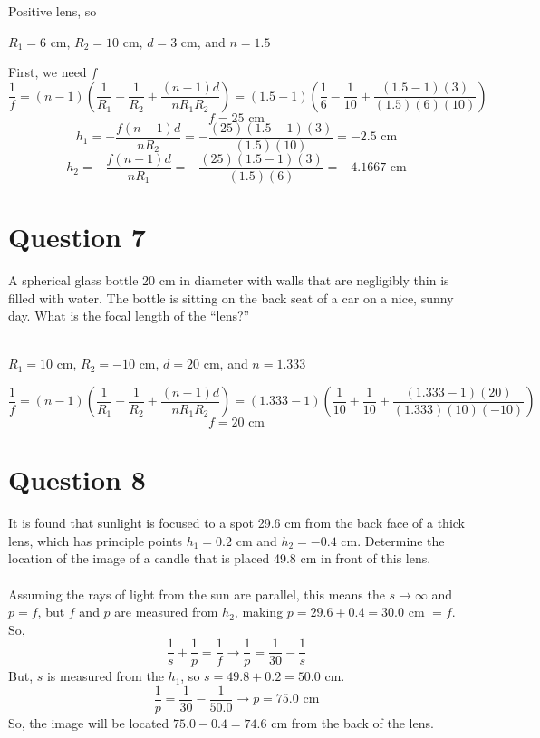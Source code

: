 \documentclass[a4paper]{article}
\begin{document}
Positive lens, so
\begin{center}
    $R_1 = 6$ cm, $R_2 = 10$ cm, $d = 3$ cm, and $n = 1.5$
\end{center}
First, we need $f$
$$ \frac{1}{f} = (n - 1) \left(\frac{1}{R_1} - \frac{1}{R_2} + \frac{(n-1)d}{nR_1 R_2}\right) = (1.5 - 1) \left(\frac{1}{6} - \frac{1}{10} + \frac{(1.5-1)(3)}{(1.5)(6)(10)}\right)$$
$$ f = 25 \textrm{ cm} $$
$$ h_1 = - \frac{f(n-1)d}{nR_2} = - \frac{(25)(1.5-1)(3)}{(1.5)(10)} = -2.5 \textrm{ cm}$$
$$ h_2 = - \frac{f(n-1)d}{nR_1} = - \frac{(25)(1.5-1)(3)}{(1.5)(6)} = -4.1667 \textrm{ cm}$$

\section*{Question 7}
A spherical glass bottle 20 cm in diameter with walls that are negligibly thin is filled with water.
The bottle is sitting on the back seat of a car on a nice, sunny day. What is the focal length of the
“lens?”\\\\

\begin{center}
    $R_1=10$ cm, $R_2=-10$ cm, $d = 20$ cm, and $n = 1.333$
\end{center}
$$ \frac{1}{f} = (n - 1) \left(\frac{1}{R_1} - \frac{1}{R_2} + \frac{(n-1)d}{nR_1 R_2}\right) = (1.333 - 1) \left(\frac{1}{10} + \frac{1}{10} + \frac{(1.333-1)(20)}{(1.333)(10)(-10)}\right)$$
$$ f = 20 \textrm{ cm}$$


\section*{Question 8}
It is found that sunlight is focused to a spot 29.6 cm from the back face of a thick lens, which has
principle points $h_1 = 0.2$ cm and $h_2 = -0.4$ cm. Determine the location of the image of a candle that
is placed 49.8 cm in front of this lens.\\\\

Assuming the rays of light from the sun are parallel, this means the $s \rightarrow \infty$ and $p=f$, but $f$ and $p$ are measured from $h_2$, making
$p = 29.6 + 0.4 = 30.0$ cm $=f$. So,
$$ \frac{1}{s} + \frac{1}{p} = \frac{1}{f} \rightarrow \frac{1}{p} = \frac{1}{30} - \frac{1}{s}$$
But, $s$ is measured from the $h_1$, so $s = 49.8 + 0.2 = 50.0$ cm.
$$ \frac{1}{p} = \frac{1}{30} - \frac{1}{50.0} \rightarrow p=75.0 \textrm{ cm}$$
So, the image will be located $75.0 - 0.4=74.6$ cm from the back of the lens.
\end{document}

